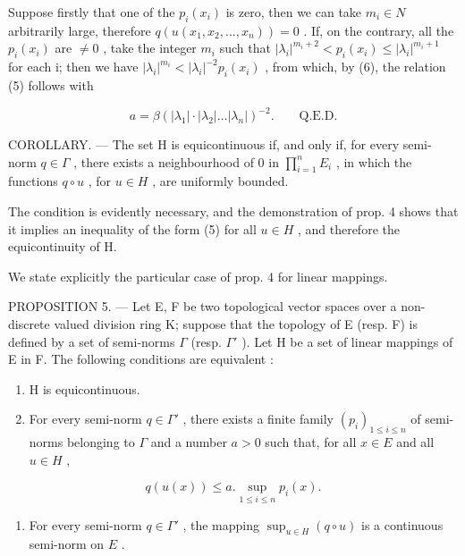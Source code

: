 Suppose firstly that one of the \(p_{i}(x_{i})\) is zero, then we can take \(m_{i} \in N\) arbitrarily large, therefore \(q(u(x_{1}, x_{2}, ..., x_{n})) = 0\) . If, on the contrary, all the \(p_{i}(x_{i})\) are \(\neq 0\) , take the integer \(m_{i}\) such that \(|\lambda_{i}|^{m_{i}+2} < p_{i}(x_{i}) \leqslant |\lambda_{i}|^{m_{i}+1}\) for each i; then we have \(|\lambda_{i}|^{m_{i}} < |\lambda_{i}|^{-2}p_{i}(x_{i})\) , from which, by (6), the relation (5) follows with

\[
a = \beta (| \lambda_ {1} | \cdot | \lambda_ {2} | \dots | \lambda_ {n} |) ^ {- 2}. \qquad \text{Q.E.D.}
\]

COROLLARY. --- The set H is equicontinuous if, and only if, for every semi-norm \(q \in \Gamma\) , there exists a neighbourhood of 0 in \(\prod_{i=1}^{n} E_{i}\) , in which the functions \(q \circ u\) , for \(u \in H\) , are uniformly bounded.

The condition is evidently necessary, and the demonstration of prop. 4 shows that it implies an inequality of the form (5) for all \(u \in H\) , and therefore the equicontinuity of H.

We state explicitly the particular case of prop. 4 for linear mappings.

PROPOSITION 5. --- Let E, F be two topological vector spaces over a non-discrete valued division ring K; suppose that the topology of E (resp. F) is defined by a set of semi-norms \(\Gamma\) (resp. \(\Gamma'\) ). Let H be a set of linear mappings of E in F. The following conditions are equivalent :

\begin{enumerate}
\def\labelenumi{\alph{enumi})}
\item
  H is equicontinuous.
\item
  For every semi-norm \(q \in \Gamma'\) , there exists a finite family \((p_i)_{1 \leq i \leq n}\) of semi-norms belonging to \(\Gamma\) and a number \(a > 0\) such that, for all \(x \in E\) and all \(u \in H\) ,
\end{enumerate}

\[
q (u (x)) \leqslant a. \sup _ {1 \leqslant i \leqslant n} p _ {i} (x).\tag{7}
\]

\begin{enumerate}
\def\labelenumi{\alph{enumi})}
\setcounter{enumi}{2}
\tightlist
\item
  For every semi-norm \(q \in \Gamma'\) , the mapping \(\sup_{u \in H} (q \circ u)\) is a continuous semi-norm on \(E\) .
\end{enumerate}

